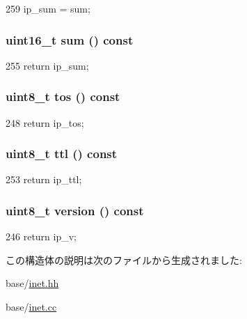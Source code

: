 \begin{DoxyCode}
259 { ip_sum = sum; }
\end{DoxyCode}
\hypertarget{structNet_1_1IpHdr_acbf3c502c7393ef0178454b237b2562f}{
\subsubsection[{sum}]{\setlength{\rightskip}{0pt plus 5cm}uint16\_\-t sum () const}}
\label{structNet_1_1IpHdr_acbf3c502c7393ef0178454b237b2562f}



\begin{DoxyCode}
255 { return ip_sum; }
\end{DoxyCode}
\hypertarget{structNet_1_1IpHdr_a3e6d0a8eff33e0b923222365fbeff0ef}{
\subsubsection[{tos}]{\setlength{\rightskip}{0pt plus 5cm}uint8\_\-t tos () const}}
\label{structNet_1_1IpHdr_a3e6d0a8eff33e0b923222365fbeff0ef}



\begin{DoxyCode}
248 { return ip_tos; }
\end{DoxyCode}
\hypertarget{structNet_1_1IpHdr_a9618cc77ddbbbdcbeb181b51cb1c3fc5}{
\subsubsection[{ttl}]{\setlength{\rightskip}{0pt plus 5cm}uint8\_\-t ttl () const}}
\label{structNet_1_1IpHdr_a9618cc77ddbbbdcbeb181b51cb1c3fc5}



\begin{DoxyCode}
253 { return ip_ttl; }
\end{DoxyCode}
\hypertarget{structNet_1_1IpHdr_aa3599d88ee3f2dd92bec653b3a607b6b}{
\subsubsection[{version}]{\setlength{\rightskip}{0pt plus 5cm}uint8\_\-t version () const}}
\label{structNet_1_1IpHdr_aa3599d88ee3f2dd92bec653b3a607b6b}



\begin{DoxyCode}
246 { return ip_v; }
\end{DoxyCode}


この構造体の説明は次のファイルから生成されました:\begin{DoxyCompactItemize}
\item 
base/\hyperlink{inet_8hh}{inet.hh}\item 
base/\hyperlink{inet_8cc}{inet.cc}\end{DoxyCompactItemize}
